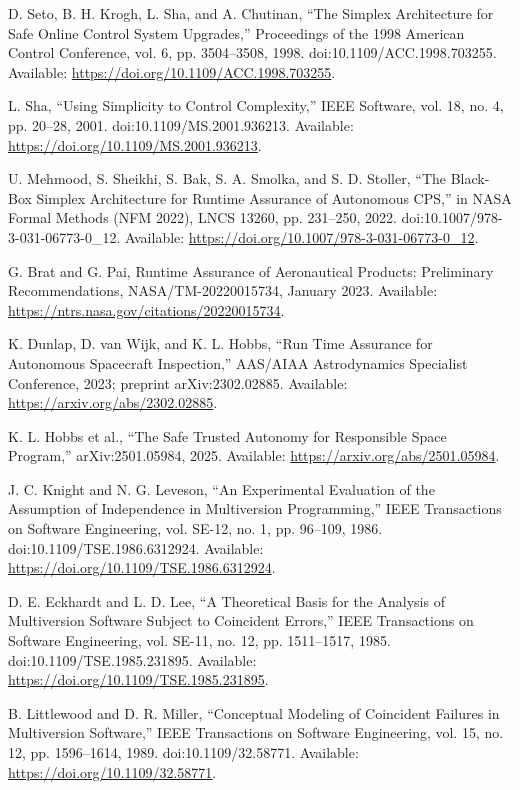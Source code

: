  D. Seto, B. H. Krogh, L. Sha, and A. Chutinan, ``The Simplex Architecture for Safe Online Control System Upgrades,'' Proceedings of the 1998 American Control Conference, vol. 6, pp. 3504--3508, 1998. doi:10.1109/ACC.1998.703255. Available: \url{https://doi.org/10.1109/ACC.1998.703255}.

 L. Sha, ``Using Simplicity to Control Complexity,'' IEEE Software, vol. 18, no. 4, pp. 20--28, 2001. doi:10.1109/MS.2001.936213. Available: \url{https://doi.org/10.1109/MS.2001.936213}.

 U. Mehmood, S. Sheikhi, S. Bak, S. A. Smolka, and S. D. Stoller, ``The Black-Box Simplex Architecture for Runtime Assurance of Autonomous CPS,'' in NASA Formal Methods (NFM 2022), LNCS 13260, pp. 231--250, 2022. doi:10.1007/978-3-031-06773-0\_12. Available: \url{https://doi.org/10.1007/978-3-031-06773-0_12}.

 G. Brat and G. Pai, Runtime Assurance of Aeronautical Products: Preliminary Recommendations, NASA/TM-20220015734, January 2023. Available: \url{https://ntrs.nasa.gov/citations/20220015734}.

 K. Dunlap, D. van Wijk, and K. L. Hobbs, ``Run Time Assurance for Autonomous Spacecraft Inspection,'' AAS/AIAA Astrodynamics Specialist Conference, 2023; preprint arXiv:2302.02885. Available: \url{https://arxiv.org/abs/2302.02885}.

 K. L. Hobbs et al., ``The Safe Trusted Autonomy for Responsible Space Program,'' arXiv:2501.05984, 2025. Available: \url{https://arxiv.org/abs/2501.05984}.

 J. C. Knight and N. G. Leveson, ``An Experimental Evaluation of the Assumption of Independence in Multiversion Programming,'' IEEE Transactions on Software Engineering, vol. SE-12, no. 1, pp. 96--109, 1986. doi:10.1109/TSE.1986.6312924. Available: \url{https://doi.org/10.1109/TSE.1986.6312924}.

 D. E. Eckhardt and L. D. Lee, ``A Theoretical Basis for the Analysis of Multiversion Software Subject to Coincident Errors,'' IEEE Transactions on Software Engineering, vol. SE-11, no. 12, pp. 1511--1517, 1985. doi:10.1109/TSE.1985.231895. Available: \url{https://doi.org/10.1109/TSE.1985.231895}.

 B. Littlewood and D. R. Miller, ``Conceptual Modeling of Coincident Failures in Multiversion Software,'' IEEE Transactions on Software Engineering, vol. 15, no. 12, pp. 1596--1614, 1989. doi:10.1109/32.58771. Available: \url{https://doi.org/10.1109/32.58771}.

